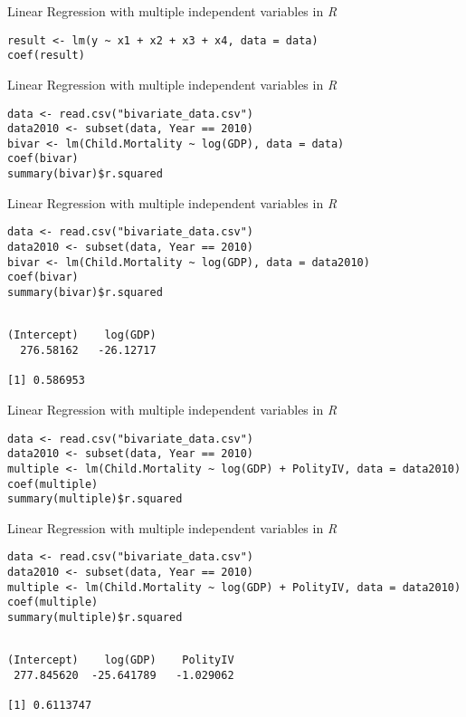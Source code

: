 \documentclass[presentation]{beamer}
\begin{document}
\begin{frame}[fragile,label={sec:orgf65f235}]{Linear Regression with multiple independent variables in \emph{R}}
 \begin{verbatim}
result <- lm(y ~ x1 + x2 + x3 + x4, data = data)
coef(result)
\end{verbatim}
\end{frame}



\begin{frame}[fragile,label={sec:orgf17f3ee}]{Linear Regression with multiple independent variables in \emph{R}}
 \begin{verbatim}
data <- read.csv("bivariate_data.csv")
data2010 <- subset(data, Year == 2010)
bivar <- lm(Child.Mortality ~ log(GDP), data = data)
coef(bivar)
summary(bivar)$r.squared
\end{verbatim}
\end{frame}

\begin{frame}[fragile,label={sec:orgdf8b564}]{Linear Regression with multiple independent variables in \emph{R}}
 \begin{verbatim}
data <- read.csv("bivariate_data.csv")
data2010 <- subset(data, Year == 2010)
bivar <- lm(Child.Mortality ~ log(GDP), data = data2010)
coef(bivar)
summary(bivar)$r.squared
\end{verbatim}

\begin{verbatim}

(Intercept)    log(GDP) 
  276.58162   -26.12717

[1] 0.586953
\end{verbatim}
\end{frame}




\begin{frame}[fragile,shrink=20,label={sec:orgf16483a}]{Linear Regression with multiple independent variables in \emph{R}}
 \begin{verbatim}
data <- read.csv("bivariate_data.csv")
data2010 <- subset(data, Year == 2010)
multiple <- lm(Child.Mortality ~ log(GDP) + PolityIV, data = data2010)
coef(multiple)
summary(multiple)$r.squared
\end{verbatim}
\end{frame}



\begin{frame}[fragile,shrink=20,label={sec:org20a128f}]{Linear Regression with multiple independent variables in \emph{R}}
 \begin{verbatim}
data <- read.csv("bivariate_data.csv")
data2010 <- subset(data, Year == 2010)
multiple <- lm(Child.Mortality ~ log(GDP) + PolityIV, data = data2010)
coef(multiple)
summary(multiple)$r.squared
\end{verbatim}

\begin{verbatim}

(Intercept)    log(GDP)    PolityIV 
 277.845620  -25.641789   -1.029062

[1] 0.6113747
\end{verbatim}
\end{frame}
\end{document}
